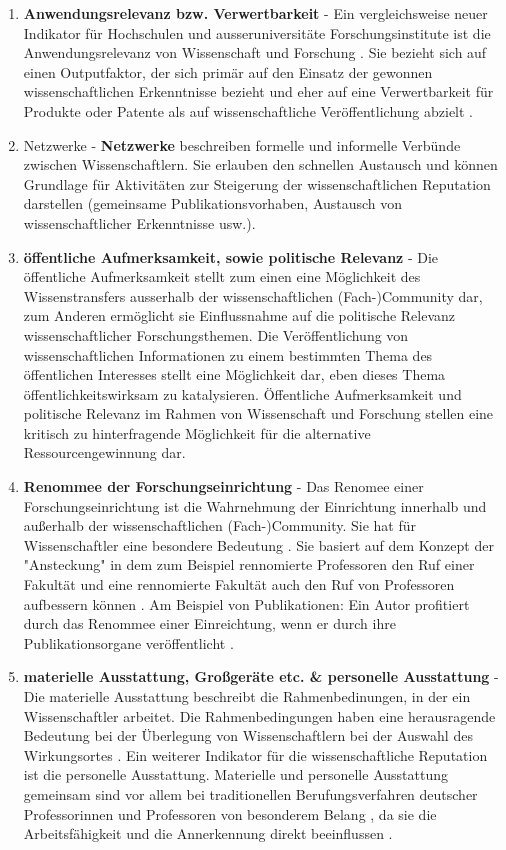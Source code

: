 \begin{enumerate}
\item\textbf{Anwendungsrelevanz bzw. Verwertbarkeit} - Ein vergleichsweise neuer Indikator für Hochschulen und ausseruniversitäte Forschungsinstitute ist die Anwendungsrelevanz von Wissenschaft und Forschung \cite{simon_2009_wissenschaft_governance}. Sie bezieht sich auf einen Outputfaktor, der sich primär auf den Einsatz der gewonnen wissenschaftlichen Erkenntnisse bezieht und eher auf eine Verwertbarkeit für Produkte oder Patente als auf wissenschaftliche Veröffentlichung abzielt \cite{suchen}.
\item Netzwerke - \textbf{Netzwerke} beschreiben formelle und informelle Verbünde zwischen Wissenschaftlern. Sie erlauben den schnellen Austausch und können Grundlage für Aktivitäten zur Steigerung der wissenschaftlichen Reputation darstellen (gemeinsame Publikationsvorhaben, Austausch von wissenschaftlicher Erkenntnisse usw.).
\item \textbf{öffentliche Aufmerksamkeit, sowie politische Relevanz} -
Die öffentliche Aufmerksamkeit stellt zum einen eine Möglichkeit des Wissenstransfers ausserhalb der wissenschaftlichen (Fach-)Community dar, zum Anderen ermöglicht sie Einflussnahme auf die politische Relevanz wissenschaftlicher Forschungsthemen. Die Veröffentlichung von wissenschaftlichen Informationen zu einem bestimmten Thema des öffentlichen Interesses stellt eine Möglichkeit dar, eben dieses Thema öffentlichkeitswirksam zu katalysieren. Öffentliche Aufmerksamkeit und politische Relevanz im Rahmen von Wissenschaft und Forschung stellen eine kritisch zu hinterfragende Möglichkeit für die alternative Ressourcengewinnung dar. \cite{suche}
\item \textbf{Renommee der Forschungseinrichtung} - 
Das Renomee einer Forschungseinrichtung ist die Wahrnehmung der Einrichtung innerhalb und außerhalb der wissenschaftlichen (Fach-)Community. Sie hat für Wissenschaftler eine besondere Bedeutung \cite{mayntz_2008_wissensproduktion}. Sie basiert auf dem Konzept der "Ansteckung" in dem zum Beispiel rennomierte Professoren den Ruf einer Fakultät und eine rennomierte Fakultät auch den Ruf von Professoren aufbessern können \cite{luhmann_1970_selbststeuerung}. Am Beispiel von Publikationen: Ein Autor profitiert durch das Renommee einer Einreichtung, wenn er durch ihre Publikationsorgane veröffentlicht \cite{lutz_2012_zugang}.
\item \textbf{materielle Ausstattung, Großgeräte etc. & personelle Ausstattung} - 
Die materielle Ausstattung beschreibt die Rahmenbedinungen, in der ein Wissenschaftler arbeitet. Die Rahmenbedingungen haben eine herausragende Bedeutung bei der Überlegung von Wissenschaftlern bei der Auswahl des Wirkungsortes \cite{mayntz_2008_wissensproduktion}. Ein weiterer Indikator für die wissenschaftliche Reputation ist die personelle Ausstattung. Materielle und personelle Ausstattung gemeinsam sind vor allem bei traditionellen Berufungsverfahren deutscher Professorinnen und Professoren von besonderem Belang \cite{himpele_2011_job}, da sie die Arbeitsfähigkeit und die Annerkennung direkt beeinflussen \cite{suche}. 

\end{enumerate}
